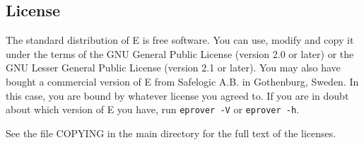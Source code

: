 \documentclass{article}
\begin{document}
\clearpage
\begin{appendix}
  \section{License}
  
  The standard distribution of E is free software. You can use, modify
  and copy it under the terms of the GNU General Public License
  (version 2.0 or later) or the GNU Lesser General Public License
  (version 2.1 or later). You may also have bought a commercial
  version of E from Safelogic A.B. in Gothenburg, Sweden. In this
  case, you are bound by whatever license you agreed to. If you are in
  doubt about which version of E you have, run \texttt{eprover -V} or
  \texttt{eprover -h}.

  See the file COPYING in the main directory for the full text of the
  licenses. 
\end{appendix}
\end{document}
